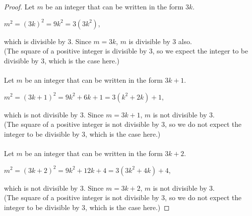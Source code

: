 \documentclass[12pt]{article}
\begin{document}
\begin{proof}
Let $m$ be an integer that can be written in the form $3k$.
\begin{center}
$m^2=(3k)^2=9k^2=3(3k^2)$,
\end{center}
which is divisible by $3$. Since $m=3k$, $m$ is divisible by $3$ also. \\
(The square of a positive integer is divisible by $3$, so we expect the integer to be divisible by $3$, which is the case here.) \\
\\
Let $m$ be an integer that can be written in the form $3k+1$.
\begin{center}
$m^2=(3k+1)^2=9k^2+6k+1=3(k^2+2k)+1$,
\end{center}
which is not divisible by $3$. Since $m=3k+1$, $m$ is not divisible by $3$. \\
(The square of a positive integer is not divisible by $3$, so we do not expect the integer to be divisible by $3$, which is the case here.) \\
\\
Let $m$ be an integer that can be written in the form $3k+2$.
\begin{center}
$m^2=(3k+2)^2=9k^2+12k+4=3(3k^2+4k)+4$,
\end{center}
which is not divisible by $3$. Since $m=3k+2$, $m$ is not divisible by $3$. \\
(The square of a positive integer is not divisible by $3$, so we do not expect the integer to be divisible by $3$, which is the case here.)
\end{proof}
\end{document}
